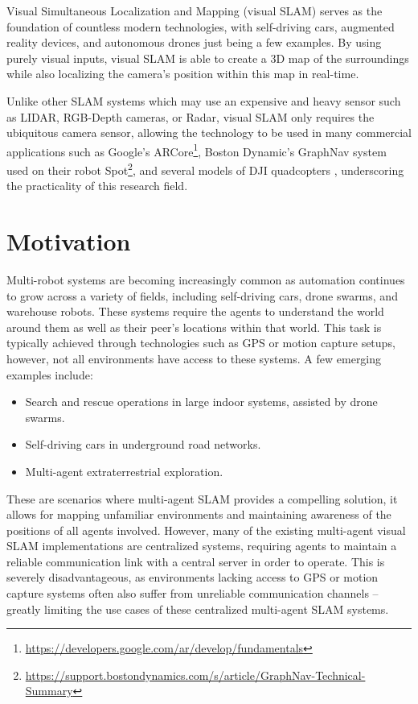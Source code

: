 
\label{sec:1}
Visual Simultaneous Localization and Mapping (visual SLAM) serves as the foundation of countless modern technologies, with self-driving cars, augmented reality devices, and autonomous drones just being a few examples. By using purely visual inputs, visual SLAM is able to create a 3D map of the surroundings while also localizing the camera's position within this map in real-time.

Unlike other SLAM systems which may use an expensive and heavy sensor such as LIDAR, RGB-Depth cameras, or Radar, visual SLAM only requires the ubiquitous camera sensor, allowing the technology to be used in many commercial applications such as Google's ARCore\footnote[1]{\url{https://developers.google.com/ar/develop/fundamentals}}, Boston Dynamic's GraphNav system used on their robot Spot\footnote[2]{\url{https://support.bostondynamics.com/s/article/GraphNav-Technical-Summary}}, and several models of DJI quadcopters \autocite{zou2019collaborative}, underscoring the practicality of this research field.

\section{Motivation}
\label{sec:motivation}
Multi-robot systems are becoming increasingly common as automation continues to grow across a variety of fields, including self-driving cars, drone swarms, and warehouse robots. These systems require the agents to understand the world around them as well as their peer's locations within that world. This task is typically achieved through technologies such as GPS or motion capture setups, however, not all environments have access to these systems. A few emerging examples include: \noparskip
\smallbreak

{
    \begin{itemize}[nosep]
        \item Search and rescue operations in large indoor systems, assisted by drone swarms.
        \item Self-driving cars in underground road networks.
        \item Multi-agent extraterrestrial exploration.
    \end{itemize}
}

These are scenarios where multi-agent SLAM provides a compelling solution, it allows for mapping unfamiliar environments and maintaining awareness of the positions of all agents involved. However, many of the existing multi-agent visual SLAM implementations are centralized systems, requiring agents to maintain a reliable communication link with a central server in order to operate. This is severely disadvantageous, as environments lacking access to GPS or motion capture systems often also suffer from unreliable communication channels – greatly limiting the use cases of these centralized multi-agent SLAM systems.

